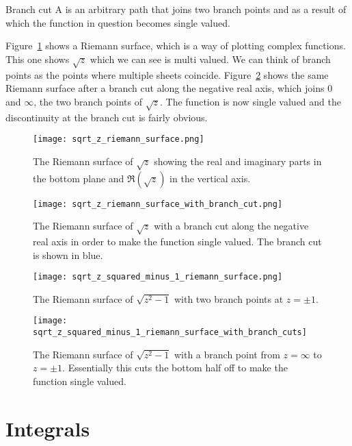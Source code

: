 \documentclass{article}
\begin{document}
    \begin{definition}{Branch cut}{}
        A  is an arbitrary path that joins two branch points and as a result of which the function in question becomes single valued.
    \end{definition}
    Figure~\ref{fig:sqrt z riemann surface} shows a Riemann surface, which is a way of plotting complex functions.
    This one shows \(\sqrt{z}\) which we can see is multi valued.
    We can think of branch points as the points where multiple sheets coincide.
    Figure~\ref{fig:sqrt z riemann surface with branch cut} shows the same Riemann surface after a branch cut along the negative real axis, which joins \(0\) and \(\infty\), the two branch points of \(\sqrt{z}\).
    The function is now single valued and the discontinuity at the branch cut is fairly obvious.
    \begin{figure}[ht]
        \centering
        \texttt{[image: sqrt\_z\_riemann\_surface.png]}
        \caption{The Riemann surface of \(\sqrt{z}\) showing the real and imaginary parts in the bottom plane and \(\Re(\sqrt{z})\) in the vertical axis.}
        \label{fig:sqrt z riemann surface}
    \end{figure}
    \begin{figure}[ht]
        \centering
        \texttt{[image: sqrt\_z\_riemann\_surface\_with\_branch\_cut.png]}
        \caption{The Riemann surface of \(\sqrt{z}\) with a branch cut along the negative real axis in order to make the function single valued. The branch cut is shown in blue.}
        \label{fig:sqrt z riemann surface with branch cut}
    \end{figure}
    
    \begin{figure}[ht]
        \centering
        \texttt{[image: sqrt\_z\_squared\_minus\_1\_riemann\_surface.png]}
        \caption{The Riemann surface of \(\sqrt{z^2 - 1}\) with two branch points at \(z = \pm 1\).}
    \end{figure}
    \begin{figure}[ht]
        \centering
        \texttt{[image: sqrt\_z\_squared\_minus\_1\_riemann\_surface\_with\_branch\_cuts]}
        \caption{The Riemann surface of \(\sqrt{z^2 - 1}\) with a branch point from \(z = \infty\) to \(z = \pm 1\). Essentially this cuts the bottom half off to make the function single valued.}
    \end{figure}

    \part{Integrals}
\end{document}
